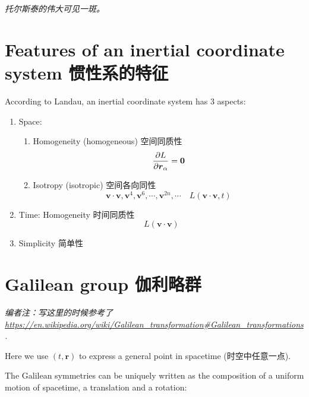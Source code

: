 \emph{托尔斯泰的伟大可见一斑。}

\section{Features of an inertial coordinate system
惯性系的特征}\label{features-of-an-inertial-coordinate-system-ux60efux6027ux7cfbux7684ux7279ux5f81}

According to Landau, an inertial coordinate system has 3 aspects:

\begin{enumerate}
\def\labelenumi{\arabic{enumi}.}
\tightlist{} 
\item 
  Space:

  \begin{enumerate}
  \def\labelenumii{(\arabic{enumii})}
  \item
    Homogeneity (homogeneous) 空间同质性
    \[{\partial L \over \partial \boldsymbol{r}_\alpha} = \boldsymbol{0}\]
  \item
    Isotropy (isotropic) 空间各向同性
    \[\boldsymbol{v} \cdot \boldsymbol{v}, \boldsymbol{v}^4, \boldsymbol{v}^6, \cdots, \boldsymbol{v}^{2n}, \cdots \quad L(\boldsymbol{v} \cdot \boldsymbol{v}, t)\]
  \end{enumerate}
\item
  Time: Homogeneity 时间同质性
  \[L(\boldsymbol{v} \cdot \boldsymbol{v})\]
\item
  Simplicity 简单性
\end{enumerate}

\section{Galilean group
伽利略群}\label{galilean-group-ux4f3dux5229ux7565ux7fa4}

\emph{编者注：写这里的时候参考了\url{https://en.wikipedia.org/wiki/Galilean_transformation\#Galilean_transformations}.}

Here we use \((t, \boldsymbol{r})\) to express a general point in
spacetime (时空中任意一点).

The Galilean symmetries can be uniquely written as the composition of a
uniform motion of spacetime, a translation and a rotation:

